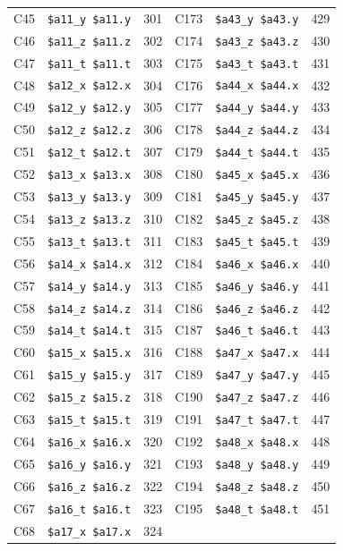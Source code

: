 \begin{table}
\begin{center}
{\begin{tabular}{|l|l|l||l|l|l|}
C45 & \verb|$a11_y $a11.y| & 301 &
C173 & \verb|$a43_y $a43.y| & 429 \\
C46 & \verb|$a11_z $a11.z| & 302 &
C174 & \verb|$a43_z $a43.z| & 430 \\
C47 & \verb|$a11_t $a11.t| & 303 &
C175 & \verb|$a43_t $a43.t| & 431 \\
C48 & \verb|$a12_x $a12.x| & 304 &
C176 & \verb|$a44_x $a44.x| & 432 \\
C49 & \verb|$a12_y $a12.y| & 305 &
C177 & \verb|$a44_y $a44.y| & 433 \\
C50 & \verb|$a12_z $a12.z| & 306 &
C178 & \verb|$a44_z $a44.z| & 434 \\
C51 & \verb|$a12_t $a12.t| & 307 &
C179 & \verb|$a44_t $a44.t| & 435 \\
C52 & \verb|$a13_x $a13.x| & 308 &
C180 & \verb|$a45_x $a45.x| & 436 \\
C53 & \verb|$a13_y $a13.y| & 309 &
C181 & \verb|$a45_y $a45.y| & 437 \\
C54 & \verb|$a13_z $a13.z| & 310 &
C182 & \verb|$a45_z $a45.z| & 438 \\
C55 & \verb|$a13_t $a13.t| & 311 &
C183 & \verb|$a45_t $a45.t| & 439 \\
C56 & \verb|$a14_x $a14.x| & 312 &
C184 & \verb|$a46_x $a46.x| & 440 \\
C57 & \verb|$a14_y $a14.y| & 313 &
C185 & \verb|$a46_y $a46.y| & 441 \\
C58 & \verb|$a14_z $a14.z| & 314 &
C186 & \verb|$a46_z $a46.z| & 442 \\
C59 & \verb|$a14_t $a14.t| & 315 &
C187 & \verb|$a46_t $a46.t| & 443 \\
C60 & \verb|$a15_x $a15.x| & 316 &
C188 & \verb|$a47_x $a47.x| & 444 \\
C61 & \verb|$a15_y $a15.y| & 317 &
C189 & \verb|$a47_y $a47.y| & 445 \\
C62 & \verb|$a15_z $a15.z| & 318 &
C190 & \verb|$a47_z $a47.z| & 446 \\
C63 & \verb|$a15_t $a15.t| & 319 &
C191 & \verb|$a47_t $a47.t| & 447 \\
C64 & \verb|$a16_x $a16.x| & 320 &
C192 & \verb|$a48_x $a48.x| & 448 \\
C65 & \verb|$a16_y $a16.y| & 321 &
C193 & \verb|$a48_y $a48.y| & 449 \\
C66 & \verb|$a16_z $a16.z| & 322 &
C194 & \verb|$a48_z $a48.z| & 450 \\
C67 & \verb|$a16_t $a16.t| & 323 &
C195 & \verb|$a48_t $a48.t| & 451 \\
C68 & \verb|$a17_x $a17.x| & 324 &

\end{tabular}}
\end{center}
\end{table}
